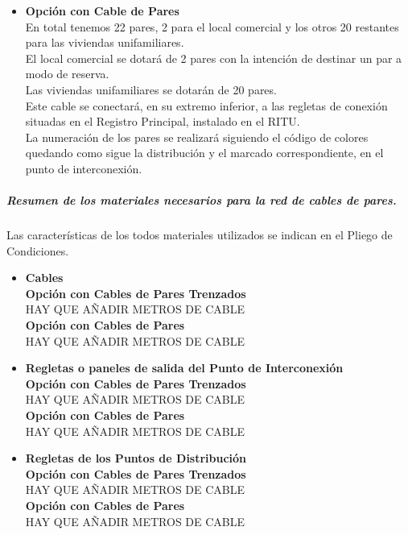 \begin{itemize}
	\item \textbf{Opción con Cable de Pares}\\
	En total tenemos 22 pares, 2 para el local comercial y los otros 20 restantes para las viviendas unifamiliares.\\
	El local comercial se dotará de 2 pares con la intención de destinar un par a modo de reserva.\\
	Las viviendas unifamiliares se dotarán de 20 pares.\\
	Este cable se conectará, en su extremo inferior, a las regletas de conexión situadas en el Registro
Principal, instalado en el RITU.\\
La numeración de los pares se realizará siguiendo el código de colores quedando como sigue la
distribución y el marcado correspondiente, en el punto de interconexión.\\
\end{itemize}

\subparagraph{Resumen de los materiales necesarios para la red de cables de pares.}
Las características de los todos materiales utilizados se indican en el Pliego de Condiciones.
\begin{itemize}
	\item \textbf{Cables}\\
	\textbf{Opción con Cables de Pares Trenzados}\\
	HAY QUE AÑADIR METROS DE CABLE\\
	\textbf{Opción con Cables de Pares}\\
	HAY QUE AÑADIR METROS DE CABLE
\end{itemize}

\begin{itemize}
	\item \textbf{Regletas o paneles de salida del Punto de Interconexión}\\
	\textbf{Opción con Cables de Pares Trenzados}\\
	HAY QUE AÑADIR METROS DE CABLE\\
	\textbf{Opción con Cables de Pares}\\
	HAY QUE AÑADIR METROS DE CABLE
\end{itemize}

\begin{itemize}
	\item \textbf{Regletas de los Puntos de Distribución}\\
	\textbf{Opción con Cables de Pares Trenzados}\\
	HAY QUE AÑADIR METROS DE CABLE\\
	\textbf{Opción con Cables de Pares}\\
	HAY QUE AÑADIR METROS DE CABLE
\end{itemize}

